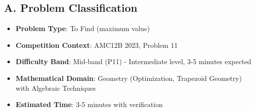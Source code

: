 \documentclass[12pt]{article}
\begin{document}
\begin{problemconfigbox}
\subsection*{A. Problem Classification}
\begin{itemize}[leftmargin=*]
    \item \textbf{Problem Type}: To Find (maximum value)
    \item \textbf{Competition Context}: AMC12B 2023, Problem 11
    \item \textbf{Difficulty Band}: Mid-band (P11) - Intermediate level, 3-5 minutes expected
    \item \textbf{Mathematical Domain}: Geometry (Optimization, Trapezoid Geometry) with Algebraic Techniques
    \item \textbf{Estimated Time}: 3-5 minutes with verification
\end{itemize}


\end{problemconfigbox}
\end{document}
